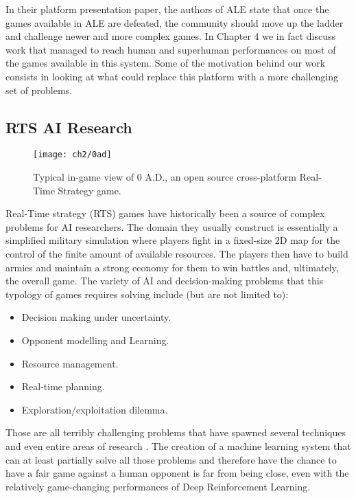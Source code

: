 In their platform presentation paper, the authors of ALE state that once the
games available in ALE are defeated, the community should move up the ladder and
challenge newer and more complex games. In Chapter 4 we in fact discuss work
that managed to reach human and superhuman performances on most of the games
available in this system. Some of the motivation behind our work consists in
looking at what could replace this platform with a more challenging set of
problems.

\subsection{RTS AI Research}

\begin{figure}[h]
    \centering
    \texttt{[image: ch2/0ad]}
    \caption{Typical in-game view of 0 A.D., an open source cross-platform
      Real-Time Strategy game.}
    \label{fig:0ad}
\end{figure}

Real-Time strategy (RTS) games have historically been a source of complex
problems for AI researchers. The domain they usually construct is essentially a
simplified military simulation where players fight in a fixed-size 2D map for
the control of the finite amount of available resources. The players then have
to build armies and maintain a strong economy for them to win battles and,
ultimately, the overall game. The variety of AI and decision-making problems
that this typology of games requires solving include (but are not limited to):

\begin{itemize}
  \item Decision making under uncertainty.
  \item Opponent modelling and Learning.
  \item Resource management.
  \item Real-time planning.
  \item Exploration/exploitation dilemma.
\end{itemize}

Those are all terribly challenging problems that have spawned several techniques
and even entire areas of research \citep{buro2003real}. The creation of a
machine learning system that can at least partially solve all those problems and
therefore have the chance to have a fair game against a human opponent is far
from being close, even with the relatively game-changing performances of Deep
Reinforcement Learning.

